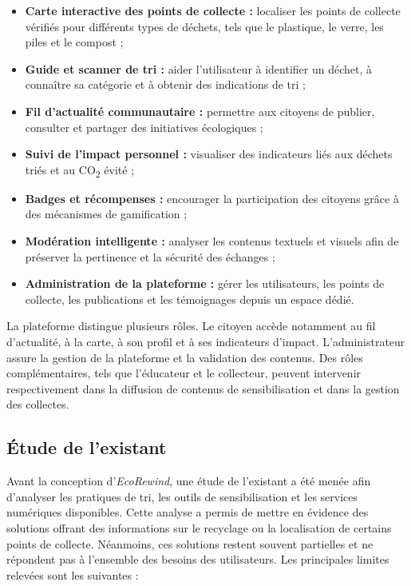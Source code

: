 \begin{itemize}
    \item \textbf{Carte interactive des points de collecte :} localiser les points de collecte vérifiés pour différents types de déchets, tels que le plastique, le verre, les piles et le compost ;
    \item \textbf{Guide et scanner de tri :} aider l'utilisateur à identifier un déchet, à connaître sa catégorie et à obtenir des indications de tri ;
    \item \textbf{Fil d'actualité communautaire :} permettre aux citoyens de publier, consulter et partager des initiatives écologiques ;
    \item \textbf{Suivi de l'impact personnel :} visualiser des indicateurs liés aux déchets triés et au CO\textsubscript{2} évité ;
    \item \textbf{Badges et récompenses :} encourager la participation des citoyens grâce à des mécanismes de gamification ;
    \item \textbf{Modération intelligente :} analyser les contenus textuels et visuels afin de préserver la pertinence et la sécurité des échanges ;
    \item \textbf{Administration de la plateforme :} gérer les utilisateurs, les points de collecte, les publications et les témoignages depuis un espace dédié.
\end{itemize}

La plateforme distingue plusieurs rôles. Le citoyen accède notamment au fil d'actualité, à la carte, à son profil et à ses indicateurs d'impact. L'administrateur assure la gestion de la plateforme et la validation des contenus. Des rôles complémentaires, tels que l'éducateur et le collecteur, peuvent intervenir respectivement dans la diffusion de contenus de sensibilisation et dans la gestion des collectes.

\subsection{Étude de l'existant}

Avant la conception d'\textit{EcoRewind}, une étude de l'existant a été menée afin d'analyser les pratiques de tri, les outils de sensibilisation et les services numériques disponibles. Cette analyse a permis de mettre en évidence des solutions offrant des informations sur le recyclage ou la localisation de certains points de collecte. Néanmoins, ces solutions restent souvent partielles et ne répondent pas à l'ensemble des besoins des utilisateurs. Les principales limites relevées sont les suivantes :

